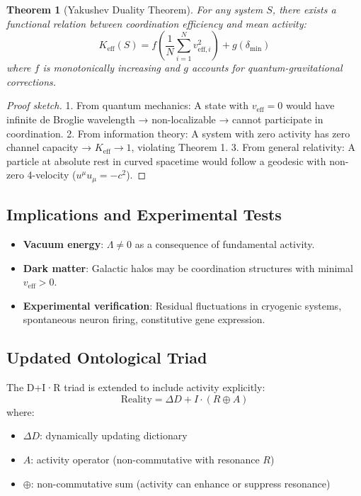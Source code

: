 \documentclass[11pt,a4paper]{article}
\newtheorem{theorem}{Theorem}
\begin{document}
\begin{theorem}[Yakushev Duality Theorem]
	For any system $S$, there exists a functional relation between coordination efficiency and mean activity:
	\[
	K_{\mathrm{eff}}(S) = f\left( \frac{1}{N}\sum_{i=1}^N v_{\mathrm{eff},i}^2 \right) + g(\delta_{\min})
	\]
	where $f$ is monotonically increasing and $g$ accounts for quantum-gravitational corrections.
\end{theorem}

\begin{proof}[Proof sketch]
	1. From quantum mechanics: A state with $v_{\mathrm{eff}} = 0$ would have infinite de Broglie wavelength → non-localizable → cannot participate in coordination.
	2. From information theory: A system with zero activity has zero channel capacity → $K_{\mathrm{eff}} \to 1$, violating Theorem 1.
	3. From general relativity: A particle at absolute rest in curved spacetime would follow a geodesic with non-zero 4-velocity ($u^\mu u_\mu = -c^2$).
\end{proof}

\subsection{Implications and Experimental Tests}

\begin{itemize}
	\item \textbf{Vacuum energy}: $\Lambda \neq 0$ as a consequence of fundamental activity.
	\item \textbf{Dark matter}: Galactic halos may be coordination structures with minimal $v_{\mathrm{eff}} > 0$.
	\item \textbf{Experimental verification}: Residual fluctuations in cryogenic systems, spontaneous neuron firing, constitutive gene expression.
\end{itemize}

\subsection{Updated Ontological Triad}

The D+I·R triad is extended to include activity explicitly:
\[
\boxed{\mathrm{Reality} = \Delta D + I \cdot (R \oplus A)}
\]
where:
\begin{itemize}
	\item $\Delta D$: dynamically updating dictionary
	\item $A$: activity operator (non-commutative with resonance $R$)
	\item $\oplus$: non-commutative sum (activity can enhance or suppress resonance)
\end{itemize}
\end{document}
